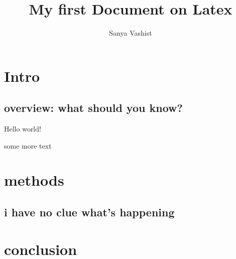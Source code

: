 \documentclass{article}
\title{My first Document on Latex}
\author{Sanya Vashist}
\begin{document}
\maketitle

\section{Intro}
\subsection{overview: what should you know?}

Hello world!

some more text

\section{methods}

\subsection{i have no clue what's happening}

\section{conclusion}
\end{document}
